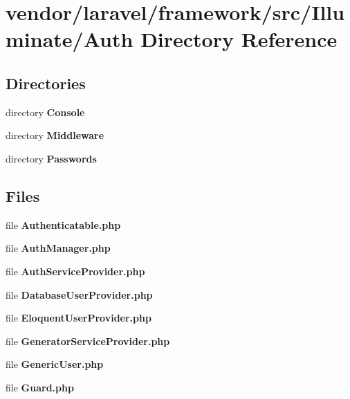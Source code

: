 \section{vendor/laravel/framework/src/\+Illuminate/\+Auth Directory Reference}
\label{dir_be06d56411b8f94d27bdc982fcfd0ed5}
\subsection*{Directories}
\begin{DoxyCompactItemize}
\item 
directory {\bf Console}
\item 
directory {\bf Middleware}
\item 
directory {\bf Passwords}
\end{DoxyCompactItemize}
\subsection*{Files}
\begin{DoxyCompactItemize}
\item 
file {\bf Authenticatable.\+php}
\item 
file {\bf Auth\+Manager.\+php}
\item 
file {\bf Auth\+Service\+Provider.\+php}
\item 
file {\bf Database\+User\+Provider.\+php}
\item 
file {\bf Eloquent\+User\+Provider.\+php}
\item 
file {\bf Generator\+Service\+Provider.\+php}
\item 
file {\bf Generic\+User.\+php}
\item 
file {\bf Guard.\+php}
\end{DoxyCompactItemize}

